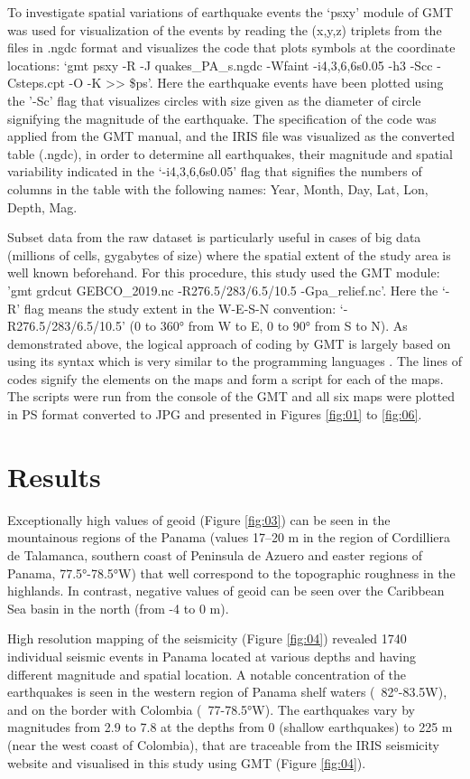 \documentclass[10pt,twoside,twocolumn,a4paper]{article}
\begin{document}
To investigate spatial variations of earthquake events the ‘psxy’ module of GMT was used for visualization of the events by reading the (x,y,z) triplets from the files in .ngdc format and visualizes the code that plots symbols at the coordinate locations: ‘gmt psxy -R -J quakes\_PA\_s.ngdc -Wfaint -i4,3,6,6s0.05 -h3 -Scc -Csteps.cpt -O -K >> \$ps’. Here the earthquake events have been plotted using the '-Sc' flag that visualizes circles with size given as the diameter of circle signifying the magnitude of the earthquake. The specification of the code was applied from the GMT manual, and the IRIS file was visualized as the converted table (.ngdc), in order to determine all earthquakes, their magnitude and spatial variability indicated in the ‘-i4,3,6,6s0.05’ flag that signifies the numbers of columns in the table with the following names: Year, Month, Day, Lat, Lon, Depth, Mag. 

Subset data from the raw dataset is particularly useful in cases of big data (millions of cells, gygabytes of size) where the spatial extent of the study area is well known beforehand. For this procedure, this study used the GMT module: 'gmt grdcut GEBCO\_2019.nc -R276.5/283/6.5/10.5  -Gpa\_relief.nc'. Here the ‘-R’ flag means the study extent in the W-E-S-N convention: ‘-R276.5/283/6.5/10.5’ (0 to 360° from W to E, 0 to 90° from S to N). 
As demonstrated above, the logical approach of coding by GMT is largely based on using its syntax which is very similar to the programming languages \cite{Lemenkov202103,Lemenkov202107}. The lines of codes signify the elements on the maps and form a script for each of the maps. The scripts were run from the console of the GMT and all six maps were plotted in PS format converted to JPG and presented in Figures \ref{fig:01} to \ref{fig:06}.

\section{Results}

Exceptionally high values of geoid (Figure \ref{fig:03}) can be seen in the mountainous regions of the Panama (values 17–20 m in the region of Cordilliera de Talamanca, southern coast of Peninsula de Azuero and easter regions of Panama, 77.5°-78.5°W) that well correspond to the topographic roughness in the highlands. In contrast, negative values of geoid can be seen over the Caribbean Sea basin in the north (from -4 to 0 m). 

High resolution mapping of the seismicity (Figure \ref{fig:04}) revealed 1740 individual seismic events in Panama located at various depths and having different magnitude and spatial location. A notable concentration of the earthquakes is seen in the western region of Panama shelf waters (~82°-83.5W), and on the border with Colombia (~77-78.5°W). The earthquakes vary by magnitudes from 2.9 to 7.8 at the depths from 0 (shallow earthquakes) to 225 m (near the west coast of Colombia), that are traceable from the IRIS seismicity website and visualised in this study using GMT (Figure \ref{fig:04}).
\end{document}
